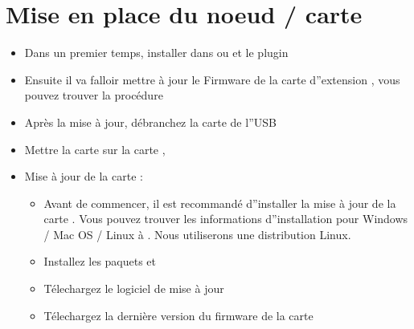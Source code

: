 \documentclass[letterpaper,10pt,french]{sphinxmanual}
\begin{document}
\section{Mise en place du noeud / carte }
\label{\detokenize{AnnexeA:mise-en-place-du-noeud-carte-fipy}}\begin{itemize}
\item {} 
Dans un premier temps, installer dans  ou  et le plugin 

\item {} 
Ensuite il va falloir mettre à jour le Firmware de la carte d”extension , vous pouvez trouver la procédure  

\item {} 
Après la mise à jour, débranchez la carte  de l”USB

\item {} 
Mettre la carte  sur la carte , 

\item {} 
Mise à jour de la carte  :
\begin{itemize}
\item {} 
Avant de commencer, il est recommandé d”installer la mise à jour de la carte . Vous pouvez trouver les informations d”installation pour Windows / Mac OS / Linux à . Nous utiliserons une distribution Linux.

\item {} 
Installez les paquets  et 

\item {} 
Télechargez le logiciel de mise à jour 

\item {} 
Télechargez la dernière version du firmware de la carte   


\end{itemize}
\end{itemize}
\end{document}
